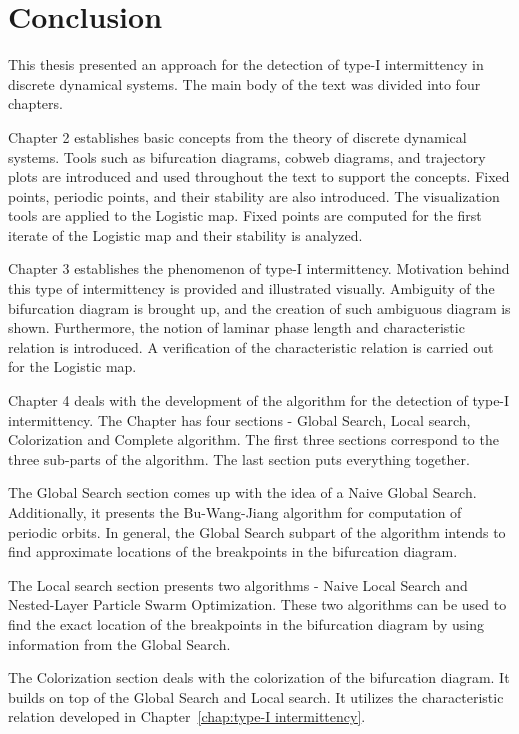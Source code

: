 \chapter{Conclusion}

This thesis presented an approach for the detection of type-I intermittency in discrete dynamical systems.
The main body of the text was divided into four chapters.
\par
Chapter 2 establishes basic concepts from the theory of discrete dynamical systems.
Tools such as bifurcation diagrams, cobweb diagrams, and trajectory plots are introduced and used throughout the text to support the concepts.
Fixed points, periodic points, and their stability are also introduced.
The visualization tools are applied to the Logistic map.
Fixed points are computed for the first iterate of the Logistic map and their stability is analyzed.
\par
Chapter 3 establishes the phenomenon of type-I intermittency.
Motivation behind this type of intermittency is provided and illustrated visually.
Ambiguity of the bifurcation diagram is brought up, and the creation of such ambiguous diagram is shown.
Furthermore, the notion of laminar phase length and characteristic relation is introduced.
A verification of the characteristic relation is carried out for the Logistic map.
\par
Chapter 4 deals with the development of the algorithm for the detection of type-I intermittency.
The Chapter has four sections - Global Search, Local search, Colorization and Complete algorithm.
The first three sections correspond to the three sub-parts of the algorithm.
The last section puts everything together.
\par
The Global Search section comes up with the idea of a Naive Global Search.
Additionally, it presents the Bu-Wang-Jiang algorithm for computation of periodic orbits.
In general, the Global Search subpart of the algorithm intends to find approximate locations of the breakpoints in the bifurcation diagram.
\par
The Local search section presents two algorithms - Naive Local Search and Nested-Layer Particle Swarm Optimization.
These two algorithms can be used to find the exact location of the breakpoints in the bifurcation diagram by using information from the Global Search.
\par
The Colorization section deals with the colorization of the bifurcation diagram.
It builds on top of the Global Search and Local search.
It utilizes the characteristic relation developed in Chapter~\ref{chap:type-I intermittency}.
